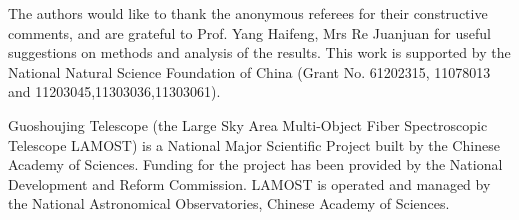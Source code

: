 \documentclass[referee]{raa}            %
\begin{document}
\begin{acknowledgements}
The authors would like to thank the anonymous referees for their constructive comments,
and are grateful to  Prof. Yang Haifeng, Mrs Re Juanjuan for useful suggestions on methods and analysis of the results.
This work is supported by the National Natural Science Foundation of China  (Grant No.  61202315, 11078013  and 11203045,11303036,11303061).

 Guoshoujing Telescope  (the Large Sky Area Multi-Object Fiber Spectroscopic Telescope LAMOST) is a National Major Scientific Project built by the Chinese Academy of Sciences.
 Funding for the project has been provided by the National Development and Reform Commission.
 LAMOST is operated and managed by the National Astronomical Observatories, Chinese Academy of Sciences.

\end{acknowledgements}

\appendix                  %








\label{lastpage}
\end{document}
